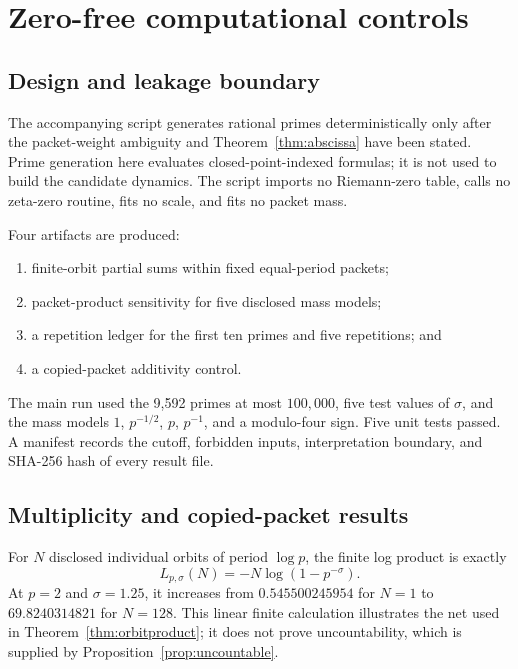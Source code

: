 \documentclass[11pt]{article}
\theoremstyle{definition}
\theoremstyle{remark}
\begin{document}
\section{Zero-free computational controls}
\label{sec:controls}

\subsection{Design and leakage boundary}

The accompanying script generates rational primes deterministically only
after the packet-weight ambiguity and Theorem~\ref{thm:abscissa} have been
stated.  Prime generation here evaluates closed-point-indexed formulas; it is
not used to build the candidate dynamics.  The script imports no Riemann-zero
table, calls no zeta-zero routine, fits no scale, and fits no packet mass.

Four artifacts are produced:
\begin{enumerate}[leftmargin=*,itemsep=2pt]
 \item finite-orbit partial sums within fixed equal-period packets;
 \item packet-product sensitivity for five disclosed mass models;
 \item a repetition ledger for the first ten primes and five repetitions; and
 \item a copied-packet additivity control.
\end{enumerate}
The main run used the 9,592 primes at most \(100{,}000\), five test values of
\(\sigma\), and the mass models \(1\), \(p^{-1/2}\), \(p\), \(p^{-1}\), and a
modulo-four sign.  Five unit tests passed.  A manifest records the cutoff,
forbidden inputs, interpretation boundary, and SHA-256 hash of every result
file.

\subsection{Multiplicity and copied-packet results}

For \(N\) disclosed individual orbits of period \(\log p\), the finite log
product is exactly
\begin{equation}
 L_{p,\sigma}(N)=-N\log(1-p^{-\sigma}).
 \label{eq:finiteorbit}
\end{equation}
At \(p=2\) and \(\sigma=1.25\), it increases from
\(0.545500245954\) for \(N=1\) to \(69.8240314821\) for \(N=128\).
This linear finite calculation illustrates the net used in
Theorem~\ref{thm:orbitproduct}; it does not prove uncountability, which is
supplied by Proposition~\ref{prop:uncountable}.
\end{document}
